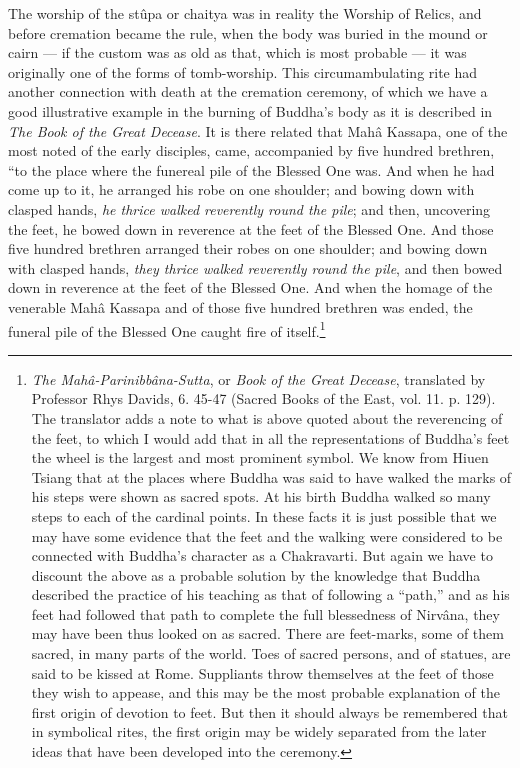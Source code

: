 \documentclass[a4paper, 11pt, oneside, polutonikogreek, english]{article}
\begin{document}
The worship of the stûpa or chaitya was in reality the Worship of Relics, and before cremation became the rule, when the body was buried in the mound or cairn --- if the custom was as old as that, which is most probable --- it was originally one of the forms of tomb-worship. This circumambulating rite had another connection with death at the cremation ceremony, of which we have a good illustrative example in the burning of Buddha's body as it is described in \emph{The Book of the Great Decease}. It is there related that Mahâ Kassapa, one of the most noted of the early disciples, came, accompanied by five hundred brethren, ``to the place where the funereal pile of the Blessed One was. And when he had come up to it, he arranged his robe on one shoulder; and bowing down with clasped hands, \emph{he thrice walked reverently round the pile}; and then, uncovering the feet, he bowed down in reverence at the feet of the Blessed One. And those five hundred brethren arranged their robes on one shoulder; and bowing down with clasped hands, \emph{they thrice walked reverently round the pile}, and then bowed down in reverence at the feet of the Blessed One. And when the homage of the venerable Mahâ Kassapa and of those five hundred brethren was ended, the funeral pile of the Blessed One caught fire of itself.\footnote{\emph{The Mahâ-Parinibbâna-Sutta}, or \emph{Book of the Great Decease}, translated by Professor Rhys Davids, 6. 45-47 (Sacred Books of the East, vol. 11. p. 129). The translator adds a note to what is above quoted about the reverencing of the feet, to which I would add that in all the representations of Buddha's feet the wheel is the largest and most prominent symbol. We know from Hiuen Tsiang that at the places where Buddha was said to have walked the marks of his steps were shown as sacred spots. At his birth Buddha walked so many steps to each of the cardinal points. In these facts it is just possible that we may have some evidence that the feet and the walking were considered to be connected with Buddha's character as a Chakravarti. But again we have to discount the above as a probable solution by the knowledge that Buddha described the practice of his teaching as that of following a ``path,'' and as his feet had followed that path to complete the full blessedness of Nirvâna, they may have been thus looked on as sacred. There are feet-marks, some of them sacred, in many parts of the world. Toes of sacred persons, and of statues, are said to be kissed at Rome. Suppliants throw themselves at the feet of those they wish to appease, and this may be the most probable explanation of the first origin of devotion to feet. But then it should always be remembered that in symbolical rites, the first origin may be widely separated from the later ideas that have been developed into the ceremony.}
\end{document}
